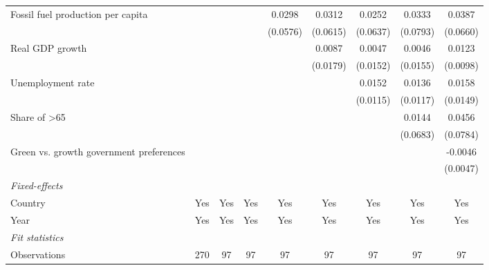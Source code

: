 \begin{table}[htbp]
\begin{tabular}{lcccccccc}
      Fossil fuel production per capita       &                 &                &               & 0.0298        & 0.0312   & 0.0252   & 0.0333   & 0.0387\\   
                                              &                 &                &               & (0.0576)      & (0.0615) & (0.0637) & (0.0793) & (0.0660)\\   
      Real GDP growth                         &                 &                &               &               & 0.0087   & 0.0047   & 0.0046   & 0.0123\\   
                                              &                 &                &               &               & (0.0179) & (0.0152) & (0.0155) & (0.0098)\\   
      Unemployment rate                       &                 &                &               &               &          & 0.0152   & 0.0136   & 0.0158\\   
                                              &                 &                &               &               &          & (0.0115) & (0.0117) & (0.0149)\\   
      Share of >65                            &                 &                &               &               &          &          & 0.0144   & 0.0456\\   
                                              &                 &                &               &               &          &          & (0.0683) & (0.0784)\\   
      Green vs. growth government preferences &                 &                &               &               &          &          &          & -0.0046\\   
                                              &                 &                &               &               &          &          &          & (0.0047)\\   
      \midrule
      \emph{Fixed-effects}\\
      Country                                 & Yes             & Yes            & Yes           & Yes           & Yes      & Yes      & Yes      & Yes\\  
      Year                                    & Yes             & Yes            & Yes           & Yes           & Yes      & Yes      & Yes      & Yes\\  
      \midrule
      \emph{Fit statistics}\\
      Observations                            & 270             & 97             & 97            & 97            & 97       & 97       & 97       & 97\\  

\end{tabular}
\end{table}
